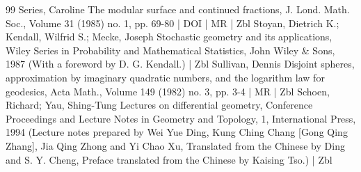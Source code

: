 \documentclass[10pt]{amsart}
\theoremstyle{definition}\newtheorem{defi}[theo]{Definition}\newtheorem{rema}[theo]{Remark}\newtheorem{exam}[theo]{Example}\newtheorem{exem}[theo]{Example}\newtheorem{nota}[theo]{Notation}
\begin{document}
\begin{thebibliography}{99}
Series, Caroline The modular surface and continued fractions, J. Lond. Math. Soc., Volume 31 (1985) no. 1, pp. 69-80 | DOI | MR | Zbl
Stoyan, Dietrich K.; Kendall, Wilfrid S.; Mecke, Joseph Stochastic geometry and its applications, Wiley Series in Probability and Mathematical Statistics, John Wiley \& Sons, 1987 (With a foreword by D. G. Kendall.) | Zbl
Sullivan, Dennis Disjoint spheres, approximation by imaginary quadratic numbers, and the logarithm law for geodesics, Acta Math., Volume 149 (1982) no. 3, pp. 3-4 | MR | Zbl
Schoen, Richard; Yau, Shing-Tung Lectures on differential geometry, Conference Proceedings and Lecture Notes in Geometry and Topology, 1, International Press, 1994 (Lecture notes prepared by Wei Yue Ding, Kung Ching Chang [Gong Qing Zhang], Jia Qing Zhong and Yi Chao Xu, Translated from the Chinese by Ding and S. Y. Cheng, Preface translated from the Chinese by Kaising Tso.) | Zbl
\end{thebibliography}
\end{document}
